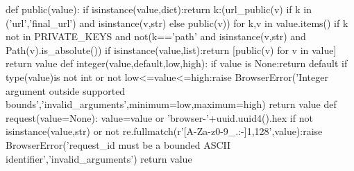 def public(value):
 if isinstance(value,dict):return {k:(url_public(v) if k in ('url','final_url') and isinstance(v,str) else public(v)) for k,v in value.items() if k not in PRIVATE_KEYS and not(k=='path' and isinstance(v,str) and Path(v).is_absolute())}
 if isinstance(value,list):return [public(v) for v in value]
 return value
def integer(value,default,low,high):
 if value is None:return default
 if type(value)is not int or not low<=value<=high:raise BrowserError('Integer argument outside supported bounds','invalid_arguments',minimum=low,maximum=high)
 return value
def request(value=None):
 value=value or 'browser-'+uuid.uuid4().hex
 if not isinstance(value,str) or not re.fullmatch(r'[A-Za-z0-9_.:-]{1,128}',value):raise BrowserError('request_id must be a bounded ASCII identifier','invalid_arguments')
 return value


